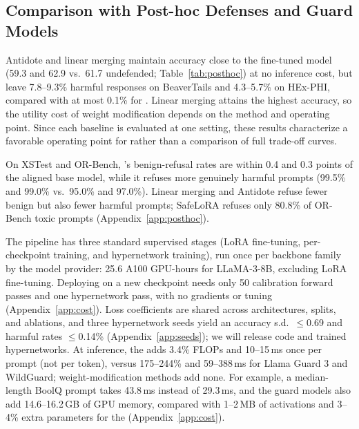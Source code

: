 \subsection{Comparison with Post-hoc Defenses and Guard Models}
\label{sec:posthoc}



 Antidote and linear merging maintain accuracy close to the fine-tuned model (59.3 and 62.9 vs.\ 61.7 undefended; Table~\ref{tab:posthoc}) at no inference cost, but leave 7.8--9.3\% harmful responses on BeaverTails and 4.3--5.7\% on HEx-PHI, compared with at most 0.1\% for \method{}. Linear merging attains the highest accuracy, so the utility cost of weight modification depends on the method and operating point. Since each baseline is evaluated at one setting, these results characterize a favorable operating point for \method{} rather than a comparison of full trade-off curves.

 On XSTest and OR-Bench, \method{}'s benign-refusal rates are within 0.4 and 0.3 points of the aligned base model, while it refuses more genuinely harmful prompts (99.5\% and 99.0\% vs.\ 95.0\% and 97.0\%). Linear merging and Antidote refuse fewer benign but also fewer harmful prompts; SafeLoRA refuses only 80.8\% of OR-Bench toxic prompts (Appendix~\ref{app:posthoc}).

 The pipeline has three standard supervised stages (LoRA fine-tuning, per-checkpoint \ssn{} training, and hypernetwork training), run once per backbone family by the model provider: 25.6 A100 GPU-hours for LLaMA-3-8B, excluding LoRA fine-tuning. Deploying on a new checkpoint needs only 50 calibration forward passes and one hypernetwork pass, with no gradients or tuning (Appendix~\ref{app:cost}). Loss coefficients are shared across architectures, splits, and ablations, and three hypernetwork seeds yield an accuracy s.d.\ $\leq$0.69 and harmful rates $\leq$0.14\% (Appendix~\ref{app:seeds}); we will release code and trained hypernetworks. At inference, the \ssn{} adds 3.4\% FLOPs and 10--15\,ms once per prompt (not per token), versus 175--244\% and 59--388\,ms for Llama Guard 3 and WildGuard; weight-modification methods add none. For example, a median-length BoolQ prompt takes 43.8\,ms instead of 29.3\,ms, and the guard models also add 14.6--16.2\,GB of GPU memory, compared with 1--2\,MB of activations and 3--4\% extra parameters for the \ssn{} (Appendix~\ref{app:cost}).

